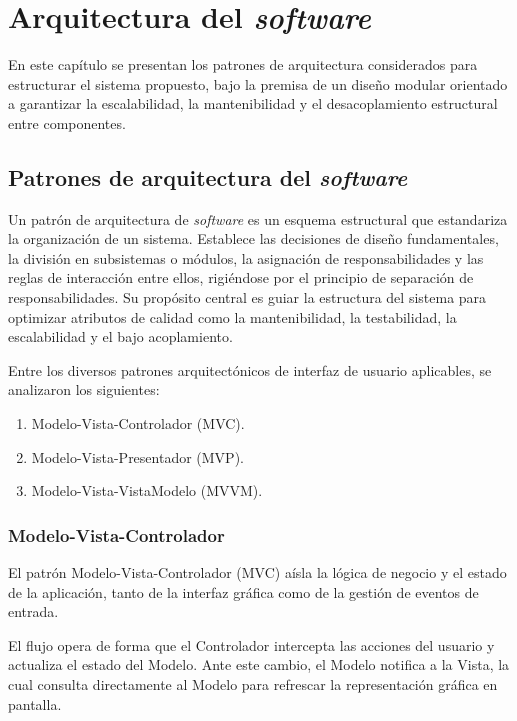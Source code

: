 \newpage
\chapter{Arquitectura del \emph{software}}
\label{ch:arquitectura_software}
\vspace{3\baselineskip}

En este capítulo se presentan los patrones de arquitectura considerados para estructurar el sistema propuesto, bajo la premisa de un diseño modular orientado a garantizar la escalabilidad, la mantenibilidad y el desacoplamiento estructural entre componentes.

\section{Patrones de arquitectura del \emph{software}}
\vspace{3\baselineskip}

Un patrón de arquitectura \cite{fowler2019architecture} de \emph{software} es un esquema estructural que estandariza la organización de un sistema. Establece las decisiones de diseño fundamentales, la división en subsistemas o módulos, la asignación de responsabilidades y las reglas de interacción entre ellos, rigiéndose por el principio de separación de responsabilidades. Su propósito central es guiar la estructura del sistema para optimizar atributos de calidad como la mantenibilidad, la testabilidad, la escalabilidad y el bajo acoplamiento.

Entre los diversos patrones arquitectónicos de interfaz de usuario aplicables, se analizaron los siguientes:

\begin{enumerate}
    \item Modelo-Vista-Controlador (MVC).
    \item Modelo-Vista-Presentador (MVP).
    \item Modelo-Vista-VistaModelo (MVVM).
\end{enumerate}

\subsection{Modelo-Vista-Controlador}

El patrón Modelo-Vista-Controlador (MVC) \cite{fowler2006gui} aísla la lógica de negocio y el estado de la aplicación, tanto de la interfaz gráfica como de la gestión de eventos de entrada.

El flujo opera de forma que el Controlador intercepta las acciones del usuario y actualiza el estado del Modelo. Ante este cambio, el Modelo notifica a la Vista, la cual consulta directamente al Modelo para refrescar la representación gráfica en pantalla.

